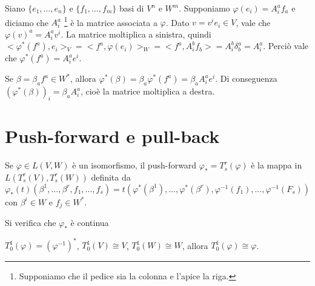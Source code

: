 Siano $\{e_1,\dots, e_n\}$ e $\{f_1,\dots, f_m\}$ basi di $V^n$ e $W^m$. Supponiamo $\varphi(e_i) = A_i^af_a$ e diciamo che $A_i^a$ \footnote{Supponiamo che il pedice sia la colonna e l'apice la riga.} è la matrice associata a $\varphi$. %
Dato $v = v^ie_i\in V$, vale che $\varphi(v)^a = A_i^a v^i$.
La matrice moltiplica a sinistra, quindi $<\varphi^*(f^a), e_i>_V = <f^a, \varphi(e_i)>_W = <f^a, A_i^b f_b> = A_i^b\delta_b^a = A_i^a$. Perciò vale che $\varphi^*(f^a) = A_i^a e^i$.

Se $\beta = \beta_a f^a \in W^*$, allora $\varphi^*(\beta) = \beta_a \varphi^*(f^a) = \beta_aA_i^ae^i$.
Di conseguenza $(\varphi^*(\beta))_i = \beta_aA_i^a$, cioè la matrice moltiplica a destra.

\section{Push-forward e pull-back}

\begin{definition}
	Se $\varphi \in L(V,W)$ è un isomorfismo, il push-forward $\varphi_* = T_s^r(\varphi)$ è la mappa in $L(T_s^r(V), T_s^r(W))$ definita da
	\begin{equation*}
		\varphi_*(t) (\beta^1,\dots,\beta^r,f_1,\dots,f_s) = t(\varphi^*(\beta^1),\dots,\varphi^*(\beta^r), \varphi^{-1}(f_1),\dots, \varphi^{-1}(F_s))
	\end{equation*}
	con $\beta^i\in W$ e $f_j\in W^*$.
\end{definition}

Si verifica che $\varphi_*$ è continua

\begin{remark}
	$T_0^1(\varphi) = (\varphi^{-1})^*$, $T_0^1(V)\cong V$, $T_0^1(W)\cong W$, allora $T_0^1(\varphi)\cong\varphi$.
\end{remark}


